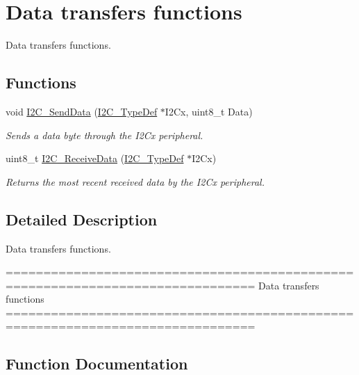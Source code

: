\hypertarget{group___i2_c___group2}{}\section{Data transfers functions}
\label{group___i2_c___group2}


Data transfers functions.  


\subsection*{Functions}
\begin{DoxyCompactItemize}
\item 
void \hyperlink{group___i2_c___group2_ga7bd9e70b8eafde0dd5eb42b0d95fe1a9}{I2\+C\+\_\+\+Send\+Data} (\hyperlink{struct_i2_c___type_def}{I2\+C\+\_\+\+Type\+Def} $\ast$I2\+Cx, uint8\+\_\+t Data)
\begin{DoxyCompactList}\small\item\em Sends a data byte through the I2\+Cx peripheral. \end{DoxyCompactList}\item 
uint8\+\_\+t \hyperlink{group___i2_c___group2_gaeaaa4b6f77f50eb57465148c55d27fb2}{I2\+C\+\_\+\+Receive\+Data} (\hyperlink{struct_i2_c___type_def}{I2\+C\+\_\+\+Type\+Def} $\ast$I2\+Cx)
\begin{DoxyCompactList}\small\item\em Returns the most recent received data by the I2\+Cx peripheral. \end{DoxyCompactList}\end{DoxyCompactItemize}


\subsection{Detailed Description}
Data transfers functions. 

\begin{DoxyVerb} ===============================================================================
                        Data transfers functions
 ===============================================================================  \end{DoxyVerb}
 

\subsection{Function Documentation}
\hypertarget{group___i2_c___group2_gaeaaa4b6f77f50eb57465148c55d27fb2}{}
